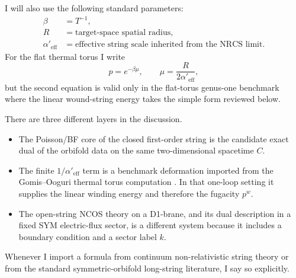\documentclass[11pt]{article}
\newcommand{\Aeff}{\alpha'_{\mathrm{eff}}}
\begin{document}
I will also use the following standard parameters:
\begin{equation}\label{eq:parameter-conventions}
\begin{aligned}
\beta&=T^{-1},
\\
R&=\text{target-space spatial radius},
\\
\Aeff&=\text{effective string scale inherited from the NRCS limit}.
\end{aligned}
\end{equation}
For the flat thermal torus I write
\begin{equation}\label{eq:fugacity-convention}
p=e^{-\beta\mu},
\qquad
\mu=\frac{R}{2\Aeff},
\end{equation}
but the second equation is valid only in the flat-torus genus-one benchmark where the linear wound-string energy takes the simple form reviewed below.

There are three different layers in the discussion.
\begin{itemize}
\item The Poisson/BF core of the closed first-order string is the candidate exact dual of the orbifold data on the same two-dimensional spacetime $C$.
\item The finite $1/\Aeff$ term is a benchmark deformation imported from the Gomis--Ooguri thermal torus computation \cite{gomis2000nonrelativisticclosedstringtheory}. In that one-loop setting it supplies the linear winding energy and therefore the fugacity $p^w$.
\item The open-string NCOS theory on a D1-brane, and its dual description in a fixed SYM electric-flux sector, is a different system because it includes a boundary condition and a sector label $k$.
\end{itemize}
Whenever I import a formula from continuum non-relativistic string theory or from the standard symmetric-orbifold long-string literature, I say so explicitly.
\end{document}
